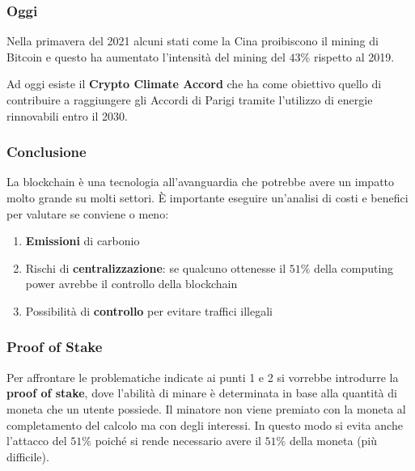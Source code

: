 \subsubsection{Oggi}
Nella primavera del 2021 alcuni stati come la Cina proibiscono il mining di Bitcoin e questo ha aumentato l'intensità del mining del $43\%$ rispetto al 2019.

Ad oggi esiste il \textbf{Crypto Climate Accord} che ha come obiettivo quello di contribuire a raggiungere gli Accordi di Parigi tramite l'utilizzo di energie rinnovabili entro il 2030.

\subsubsection{Conclusione}
La blockchain è una tecnologia all'avanguardia che potrebbe avere un impatto molto grande su molti settori. È importante eseguire un'analisi di costi e benefici per valutare se conviene o meno:
\begin{enumerate}
	\item \textbf{Emissioni} di carbonio
	\item Rischi di \textbf{centralizzazione}: se qualcuno ottenesse il $51\%$ della computing power avrebbe il controllo della blockchain
	\item Possibilità di \textbf{controllo} per evitare traffici illegali
\end{enumerate}

\subsubsection{Proof of Stake}
Per affrontare le problematiche indicate ai punti 1 e 2 si vorrebbe introdurre la \textbf{proof of stake}, dove l'abilità di minare è determinata in base alla quantità di moneta che un utente possiede. Il minatore non viene premiato con la moneta al completamento del calcolo ma con degli interessi. In questo modo si evita anche l'attacco del $51\%$ poiché si rende necessario avere il $51\%$ della moneta (più difficile).